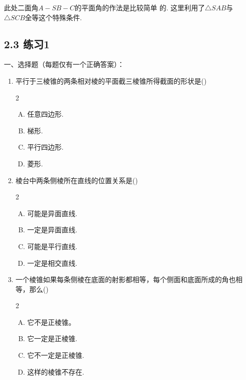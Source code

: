 \begin{remark}
    此处二面角$A-SB-C$的平面角的作法是比较简单
的. 这里利用了$\triangle SAB$与$\triangle SCB$全等这个特殊条件.
\end{remark}

\subsection*{2.3 练习1}
一、选择题（每题仅有一个正确答案）：
\begin{enumerate}
 \item 平行于三棱锥的两条相对棱的平面截三棱锥所得截面的形状是\hfill (\qquad )
 \begin{multicols}{2}
    \begin{enumerate}[(A)]
    \item 任意四边形.
    \item 梯形.
    \item 平行四边形.
    \item 菱形.
    \end{enumerate}
    \end{multicols}

\item 棱台中两条侧棱所在直线的位置关系是\hfill (\qquad )
\begin{multicols}{2}
    \begin{enumerate}[(A)]
 \item 可能是异面直线.
    \item 一定是异面直线.
    \item 可能是平行直线.
    \item 一定是相交直线.  
    \end{enumerate}
    \end{multicols}
   
\item 一个棱锥如果每条侧棱在底面的射影都相等，每个侧面和底面所成的角也相等，那么\hfill (\qquad )
\begin{multicols}{2}
    \begin{enumerate}[(A)]
        \item 它不是正棱锥。
        \item 它一定是正棱锥.
        \item 它不一定是正棱锥.
        \item 这样的棱锥不存在.
    \end{enumerate}
    \end{multicols}


\end{enumerate}
